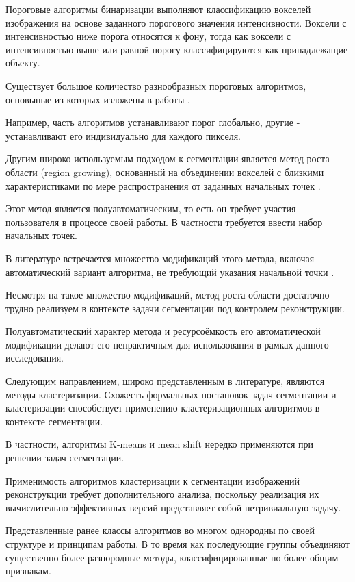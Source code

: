 Пороговые алгоритмы бинаризации выполняют классификацию вокселей изображения на основе заданного порогового значения интенсивности. Воксели с интенсивностью ниже порога относятся к фону, тогда как воксели с интенсивностью выше или равной порогу классифицируются как принадлежащие объекту.

Существует большое количество разнообразных пороговых алгоритмов, основыные из которых изложены в работы \cite{wirjadi2007survey}. 

Например, часть алгоритмов устанавливают порог глобально, другие - устанавливают его индивидуально для каждого пикселя. 

Другим широко используемым подходом к сегментации является метод роста области (region growing), основанный на объединении вокселей с близкими характеристиками по мере распространения от заданных начальных точек \cite{adams1994seeded}.

Этот метод является полуавтоматическим, то есть он требует участия пользователя в процессе своей работы. В частности требуется ввести набор начальных точек.

В литературе встречается множество модификаций этого метода, включая автоматический вариант алгоритма, не требующий указания начальной точки \cite{lin2000unseeded}. 

Несмотря на такое множество модификаций, метод роста области достаточно трудно реализуем в контексте задачи сегментации под контролем реконструкции.

Полуавтоматический характер метода и ресурсоёмкость его автоматической модификации делают его непрактичным для использования в рамках данного исследования.

Следующим направлением, широко представленным в литературе, являются методы кластеризации. Схожесть формальных постановок задач сегментации и кластеризации способствует применению кластеризационных алгоритмов в контексте сегментации.

В частности, алгоритмы K-means \cite{sarker2017segmentation} и mean shift \cite{comaniciu2002mean} нередко применяются при решении задач сегментации.

Применимость алгоритмов кластеризации к сегментации изображений реконструкции требует дополнительного анализа, поскольку реализация их вычислительно эффективных версий представляет собой нетривиальную задачу.

Представленные ранее классы алгоритмов во многом однородны по своей структуре и принципам работы. В то время как последующие группы объединяют существенно более разнородные методы, классифицированные по более общим признакам.

